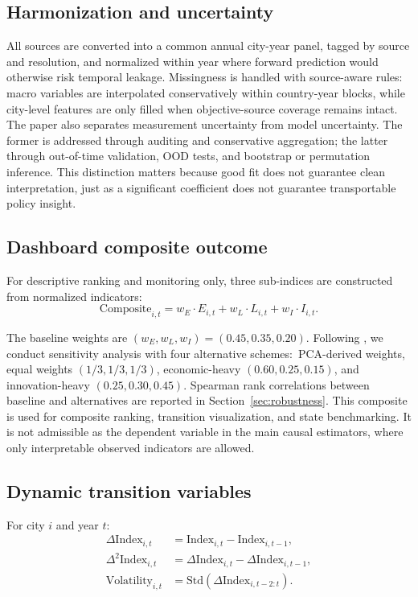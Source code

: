 \documentclass[11pt,a4paper]{article}
\newcommand{\Composite}{\text{Composite}}
\newcommand{\Index}{\text{Index}}
\newcommand{\Volatility}{\text{Volatility}}
\begin{document}
\subsection{Harmonization and uncertainty}
All sources are converted into a common annual city-year panel, tagged by source and resolution, and normalized within year where forward prediction would otherwise risk temporal leakage.
Missingness is handled with source-aware rules: macro variables are interpolated conservatively within country-year blocks, while city-level features are only filled when objective-source coverage remains intact.
The paper also separates measurement uncertainty from model uncertainty.
The former is addressed through auditing and conservative aggregation; the latter through out-of-time validation, OOD tests, and bootstrap or permutation inference.
This distinction matters because good fit does not guarantee clean interpretation, just as a significant coefficient does not guarantee transportable policy insight.

\subsection{Dashboard composite outcome}
For descriptive ranking and monitoring only, three sub-indices are constructed from normalized indicators:
\begin{equation}
  \Composite_{i,t} = w_E \cdot E_{i,t} + w_L \cdot L_{i,t} + w_I \cdot I_{i,t}.
\end{equation}

The baseline weights are $(w_E, w_L, w_I) = (0.45, 0.35, 0.20)$.
Following \citet{oecd2008handbook}, we conduct sensitivity analysis with four alternative schemes:\ PCA-derived weights, equal weights $(1/3, 1/3, 1/3)$, economic-heavy $(0.60, 0.25, 0.15)$, and innovation-heavy $(0.25, 0.30, 0.45)$.
Spearman rank correlations between baseline and alternatives are reported in Section~\ref{sec:robustness}.
This composite is used for composite ranking, transition visualization, and state benchmarking.
It is not admissible as the dependent variable in the main causal estimators, where only interpretable observed indicators are allowed.

\subsection{Dynamic transition variables}
For city $i$ and year $t$:
\begin{align}
  \Delta \Index_{i,t} &= \Index_{i,t} - \Index_{i,t-1}, \\
  \Delta^2 \Index_{i,t} &= \Delta \Index_{i,t} - \Delta \Index_{i,t-1}, \\
  \Volatility_{i,t} &= \mathrm{Std}(\Delta \Index_{i,t-2:t}).
\end{align}
\end{document}
